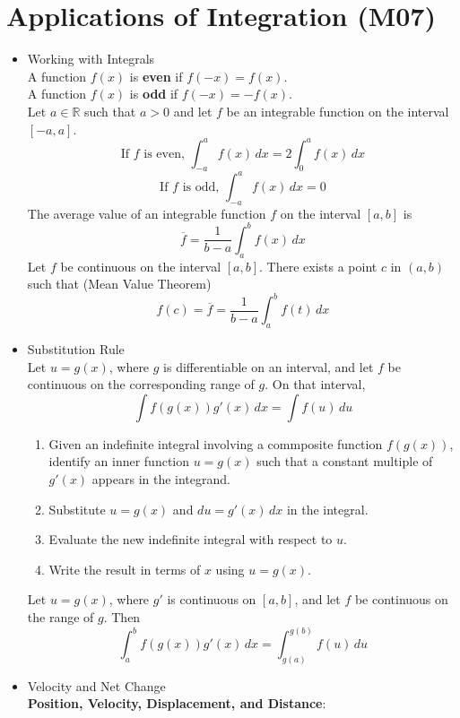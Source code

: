 \documentclass{article}
\begin{document}
\section*{Applications of Integration (M07)}
\begin{itemize}
    \item Working with Integrals \\
        A function $f(x)$ is \textbf{even} if $f(-x) = f(x)$. \\
        A function $f(x)$ is \textbf{odd} if $f(-x) = -f(x)$. \\
        Let $a \in \mathbb{R}$ such that $a > 0$ and let $f$ be an integrable function on the interval $[-a,a]$.
        $$\text{If } f \text{ is even, } \int_{-a}^a{f(x)\,dx} = 2\int_0^a{f(x)\,dx}$$
        $$\text{If } f \text{ is odd, } \int_{-a}^a{f(x)\,dx} = 0$$
        The average value of an integrable function $f$ on the interval $[a,b]$ is
        $$\overline{f} = \frac{1}{b - a}\int_a^b{f(x)\,dx}$$
        Let $f$ be continuous on the interval $[a,b]$. There exists a point $c$ in $(a,b)$ such that (Mean Value Theorem)
        $$f(c) = \overline{f} = \frac{1}{b - a}\int_a^b{f(t)\,dx}$$
    \item Substitution Rule \\
        Let $u = g(x)$, where $g$ is differentiable on an interval, and let $f$ be continuous on the corresponding range of $g$. On that interval,
        $$\int{f(g(x))g'(x)\,dx} = \int{f(u)\,du}$$
        \begin{enumerate}
            \item Given an indefinite integral involving a commposite function $f(g(x))$, identify an inner function $u = g(x)$ such that a constant multiple of $g'(x)$ appears in the integrand.
            \item Substitute $u = g(x)$ and $du = g'(x)\,dx$ in the integral.
            \item Evaluate the new indefinite integral with respect to $u$.
            \item Write the result in terms of $x$ using $u = g(x)$.
        \end{enumerate}
        Let $u = g(x)$, where $g'$ is continuous on $[a,b]$, and let $f$ be continuous on the range of $g$. Then
        $$\int_a^b{f(g(x))g'(x)\,dx} = \int_{g(a)}^{g(b)}{f(u)\,du}$$
    \item Velocity and Net Change \\
        \textbf{Position, Velocity, Displacement, and Distance}:
        \begin{enumerate}

\end{enumerate}
\end{itemize}
\end{document}
